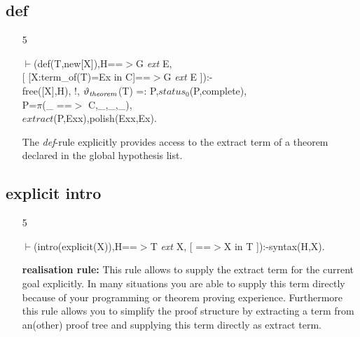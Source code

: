 \documentclass[11pt]{report}
\begin{document}
 \subsection{def} 
 \begin{enumerate} 
 \item[5]
\begin{sf}\begin{tabbing}
$\vdash$(def(T,new[X]),H==$>$G \mbox{\it ext} E, \\[-0.15ex]
\hspace{2em}[ [X:term\_\hspace{0.1em}of(T)=Ex in C]==$>$G \mbox{\it ext} E ]):-\\[-0.15ex]
\hspace{2em}free([X],H), !, $\vartheta_{\it theorem}$(T) =: P,$status_0$(P,complete),\\[-0.15ex]
\hspace{2em}P=$\pi$(\_\hspace{0.1em} ==$>$ C,\_\hspace{0.1em},\_\hspace{0.1em},\_\hspace{0.1em}),\\[-0.15ex]
\hspace{2em}$extract$(P,Exx),polish(Exx,Ex).
\end{tabbing}\end{sf}

 The \emph{def}-rule explicitly provides access to the
 extract term of a theorem declared in the global hypothesis list.
 \end{enumerate}
  
 \subsection{explicit intro}
 \begin{enumerate}
 \item[5]
\begin{sf}\begin{tabbing}
$\vdash$(intro(explicit(X)),H==$>$T \mbox{\it ext} X, [ ==$>$X in T ]):-syntax(H,X).
\end{tabbing}\end{sf}

 {\bf realisation rule:}
 This rule allows to supply the extract term for the current
 goal explicitly. In many situations you are able to supply
 this term directly because of your programming or theorem
 proving experience. Furthermore this rule allows you 
 to simplify the proof structure by extracting a term from an(other) 
 proof tree and supplying this term directly as extract term.
 \end{enumerate}
  
\end{document}

